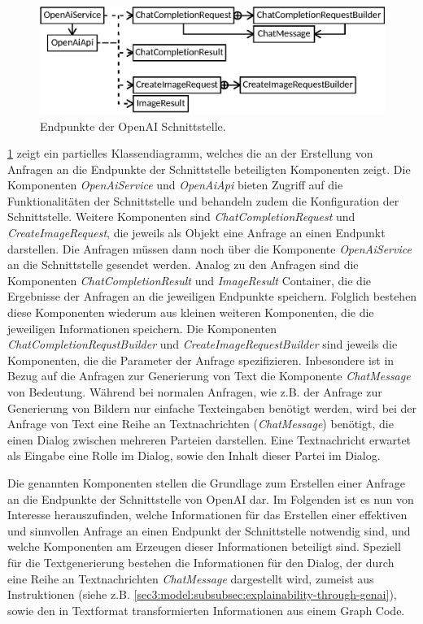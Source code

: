 \begin{figure}[htb]
    \centering
    \includegraphics{chapter/chapter_3/mechanisms/openai-endpoint-mech.eps}
    \caption{Endpunkte der OpenAI Schnittstelle.}
    \label{sec3:model:subsubsec:genai-integration:fig:openai-endpoint-comps}
\end{figure}

\cref{sec3:model:subsubsec:genai-integration:fig:openai-endpoint-comps} zeigt ein partielles Klassendiagramm, welches die an der Erstellung von Anfragen an die Endpunkte der Schnittstelle beteiligten Komponenten zeigt.
Die Komponenten \textit{OpenAiService} und \textit{OpenAiApi} bieten Zugriff auf die Funktionalitäten der Schnittstelle und behandeln zudem die Konfiguration der Schnittstelle.
Weitere Komponenten sind \textit{ChatCompletionRequest} und \textit{CreateImageRequest}, die jeweils als Objekt eine Anfrage an einen Endpunkt darstellen.
Die Anfragen müssen dann noch über die Komponente \textit{OpenAiService} an die Schnittstelle gesendet werden.
Analog zu den Anfragen sind die Komponenten \textit{ChatCompletionResult} und \textit{ImageResult} Container, die die Ergebnisse der Anfragen an die jeweiligen Endpunkte speichern.
Folglich bestehen diese Komponenten wiederum aus kleinen weiteren Komponenten, die die jeweiligen Informationen speichern.
Die Komponenten \textit{ChatCompletionRequstBuilder} und \textit{CreateImageRequestBuilder} sind jeweils die Komponenten, die die Parameter der Anfrage spezifizieren.
Inbesondere ist in Bezug auf die Anfragen zur Generierung von Text die Komponente \textit{ChatMessage} von Bedeutung.
Während bei normalen Anfragen, wie z.B. der Anfrage zur Generierung von Bildern nur einfache Texteingaben benötigt werden, wird bei der Anfrage von Text eine Reihe an Textnachrichten (\textit{ChatMessage}) benötigt, die einen Dialog zwischen mehreren Parteien darstellen.
Eine Textnachricht erwartet als Eingabe eine Rolle im Dialog, sowie den Inhalt dieser Partei im Dialog.

Die genannten Komponenten stellen die Grundlage zum Erstellen einer Anfrage an die Endpunkte der Schnittstelle von OpenAI dar.
Im Folgenden ist es nun von Interesse herauszufinden, welche Informationen für das Erstellen einer effektiven und sinnvollen Anfrage an einen Endpunkt der Schnittstelle notwendig sind, und welche Komponenten am Erzeugen dieser Informationen beteiligt sind.
Speziell für die Textgenerierung bestehen die Informationen für den Dialog, der durch eine Reihe an Textnachrichten \textit{ChatMessage} dargestellt wird, zumeist aus Instruktionen (siehe z.B. \cref{sec3:model:subsubsec:explainability-through-genai}), sowie den in Textformat transformierten Informationen aus einem Graph Code.

